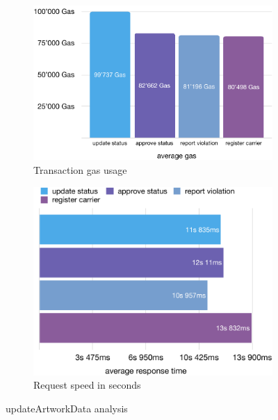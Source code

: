 \begin{figure}[h]
    \begin{subfigure}{0.49\textwidth}
        \includegraphics[width=\textwidth]{diagrams/updateArtworkData_gas_eval.pdf}
        \caption{Transaction gas usage}
        \label{fig:updateArtworkData_tx_cost}
    \end{subfigure}
    \hfill
    \begin{subfigure}{0.49\textwidth}
        \includegraphics[width=\textwidth]{diagrams/updateArtworkData_request_time_eval.pdf}
        \caption{Request speed in seconds}
        \label{fig:updateArtworkData_tx_speed}
    \end{subfigure}
    \caption{updateArtworkData analysis}
    \label{fig:updateArtworkData_analysis}
\end{figure}

